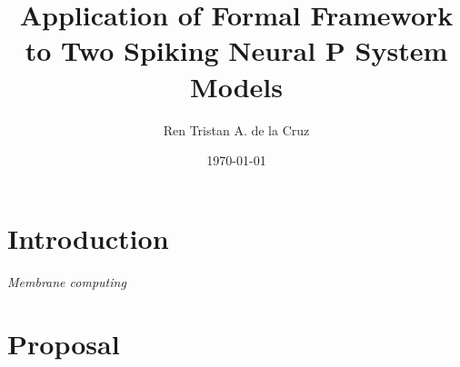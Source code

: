 \documentclass[12pt,A4]{article}
\title
{
   Application of Formal Framework to Two Spiking Neural P System Models 
}
\author
{
   Ren Tristan A. de la Cruz
}
\date
{
   \today
}
\begin{document}
\maketitle


\section{Introduction}

\emph{Membrane computing}

\cite{verlan-2020-ff}


\section{Proposal}






\end{document}
